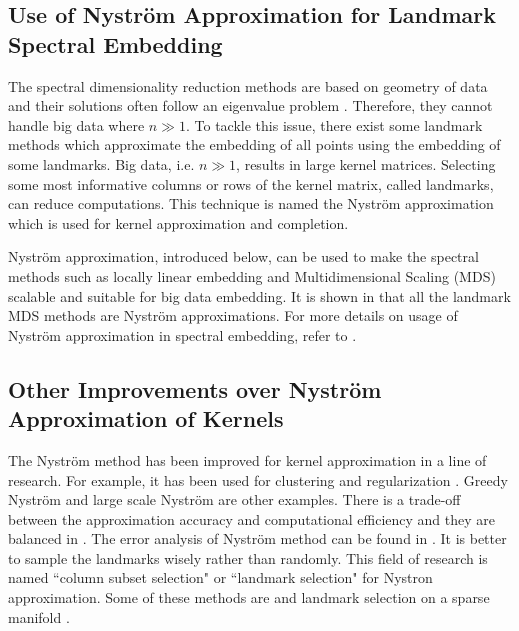 \documentclass[lang=cn,10pt]{gorgeousnbook}
\numberwithin{equation}{section}%
\numberwithin{figure}{section}%
\begin{document}
\subsection{Use of Nystr{\"o}m Approximation for Landmark Spectral Embedding}

The spectral dimensionality reduction methods \cite{saul2006spectral} are based on geometry of data and their solutions often follow an eigenvalue problem \cite{ghojogh2019eigenvalue}. 
Therefore, they cannot handle big data where $n \gg 1$. To tackle this issue, there exist some landmark methods which approximate the embedding of all points using the embedding of some landmarks. 
Big data, i.e. $n \gg 1$, results in large kernel matrices. Selecting some most informative columns or rows of the kernel matrix, called landmarks, can reduce computations. This technique is named the Nystr{\"o}m approximation which is used for kernel approximation and completion. 

Nystr{\"o}m approximation, introduced below, can be used to make the spectral methods such as locally linear embedding \cite{ghojogh2020locally} and Multidimensional Scaling (MDS) \cite{ghojogh2020multidimensional} scalable and suitable for big data embedding. 
It is shown in \cite{platt2005fastmap} that all the landmark MDS methods are Nystr{\"o}m approximations.
For more details on usage of Nystr{\"o}m approximation in spectral embedding, refer to \cite{ghojogh2020locally,ghojogh2020multidimensional}.

\subsection{Other Improvements over Nystr{\"o}m Approximation of Kernels}\label{section_improvements_over_Nystrom}

The Nystr{\"o}m method has been improved for kernel approximation in a line of research. For example, it has been used for clustering \cite{fowlkes2004spectral} and regularization \cite{rudi2015less}. 
Greedy Nystr{\"o}m \cite{farahat2011novel,farahat2015greedy} and large scale Nystr{\"o}m \cite{li2010making} are other examples. 
There is a trade-off between the approximation accuracy and computational efficiency and they are balanced in \cite{lim2015double,lim2018multi}. 
The error analysis of Nystr{\"o}m method can be found in \cite{zhang2008improved,zhang2010clustered}.
It is better to sample the landmarks wisely rather than randomly. This field of research is named ``column subset selection" or ``landmark selection" for Nystron approximation. Some of these methods are \cite{kumar2009sampling,kumar2012sampling} and landmark selection on a sparse manifold \cite{silva2006selecting}.
\end{document}
